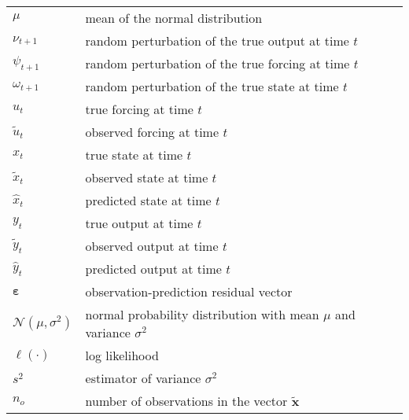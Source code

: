 \begin{center}
\begin{longtable}{lp{10cm}}
$\mu$&mean of the normal distribution\\
$\nu_{t+1}$&random perturbation of the true output at time $t$\\
$\psi_{t+1}$&random perturbation of the true forcing at time $t$\\
$\omega_{t+1}$&random perturbation of the true state at time $t$\\
$u_t$&true forcing at time $t$\\
$\tilde{u}_t$&observed forcing at time $t$\\
$x_t$&true state at time $t$\\
$\tilde{x}_t$&observed state at time $t$\\
$\hat{x}_t$&predicted state at time $t$\\
$y_t$&true output at time $t$\\
$\tilde{y}_t$&observed output at time $t$\\
$\hat{y}_t$&predicted output at time $t$\\
$\boldsymbol\varepsilon$&observation-prediction residual vector\\
$\mathcal{N}(\mu,\sigma^2)$&normal probability distribution with mean $\mu$ and variance $\sigma^2$\\
$\ell(\cdot{})$&log likelihood\\
$s^2$&estimator of variance $\sigma^2$\\
$n_o$&number of observations in the vector $\tilde{\mathbf{x}}$\\
\end{longtable}
\end{center}
